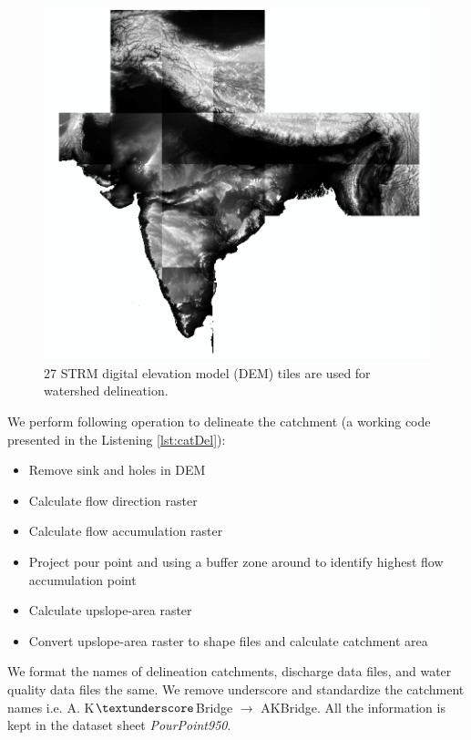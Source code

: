 \documentclass[a4paper, 12pt]{article}
\begin{document}
\begin{figure}[!h]
\includegraphics[width = 1\textwidth]{Figures/DEMTiles.png}
\caption{27 STRM digital elevation model (DEM) tiles are used for watershed delineation.}
\label{fig:demTiles}
\end{figure}

We perform following operation to delineate the catchment (a working code presented in the Listening \ref{lst:catDel}):
\begin{itemize}
\item{Remove sink and holes in DEM}
\item{Calculate flow direction raster}
\item{Calculate flow accumulation raster}
\item{Project pour point and using a buffer zone around to identify highest flow accumulation point}
\item{Calculate upslope-area raster}
\item{Convert upslope-area raster to shape files and calculate catchment area}
\end{itemize}

We format the names of delineation catchments, discharge data files, and water quality data files the same. We remove underscore and standardize the catchment names i.e. A. K$\textunderscore$Bridge $\rightarrow$ AKBridge. All the information is kept in the dataset sheet \emph{PourPoint950}.
\end{document}
